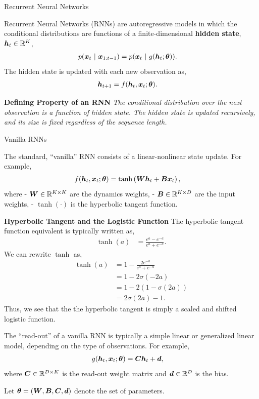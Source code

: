 \documentclass[aspectratio=169]{beamer}
\begin{document}
\begin{frame}[t,allowframebreaks]{Recurrent Neural
Networks}\label{recurrent-neural-networks-1}

Recurrent Neural Networks (RNNs) are autoregressive models in which the
conditional distributions are functions of a finite-dimensional
\textbf{hidden state}, \(\boldsymbol{h}_t \in \mathbb{R}^K\), \begin{align*}
p(\boldsymbol{x}_t ~\vert~ \boldsymbol{x}_{1:t-1}) &= p(\boldsymbol{x}_t ~\vert~ g(\boldsymbol{h}_t; \boldsymbol{\theta})).
\end{align*} The hidden state is updated with each new observation as,
\begin{align*}
\boldsymbol{h}_{t+1} &= f(\boldsymbol{h}_t, \boldsymbol{x}_t; \boldsymbol{\theta}).
\end{align*}

\textbf{Defining Property of an RNN} 
\emph{The conditional distribution over the next observation is a function of hidden state. The hidden state is updated recursively, and its size is fixed regardless of the sequence length.} 

\end{frame}

\begin{frame}[t,allowframebreaks]{Vanilla RNNs}\label{vanilla-rnns}

The standard, ``vanilla'' RNN consists of a linear-nonlinear state
update. For example, \begin{align*}
f(\boldsymbol{h}_t, \boldsymbol{x}_t; \boldsymbol{\theta})
&= \tanh \left(\boldsymbol{W} \boldsymbol{h}_t + \boldsymbol{B} \boldsymbol{x}_t \right),
\end{align*} where - \(\boldsymbol{W} \in \mathbb{R}^{K \times K}\) are the dynamics
weights, - \(\boldsymbol{B} \in \mathbb{R}^{K \times D}\) are the input weights, -
\(\tanh(\cdot)\) is the hyperbolic tangent function.

\textbf{Hyperbolic Tangent and the Logistic Function}
The hyperbolic tangent function equivalent is typically written
as, 
\begin{align*}
\tanh(a) &= \frac{e^a - e^{-a}}{e^a + e^{-a}}. 
\end{align*} 
We can rewrite $\tanh$ as, 
\begin{align*}
\tanh(a) &= 1 - \frac{2e^{-a}}{e^a + e^{-a}} \\
&= 1 - 2 \sigma(-2a) \\
&= 1 - 2 (1 - \sigma(2a)) \\
&= 2 \sigma(2a) - 1.
\end{align*} 
Thus, we see that the the hyperbolic tangent is simply a
scaled and shifted logistic function. 

The ``read-out'' of a vanilla RNN is typically a simple linear or
generalized linear model, depending on the type of observations. For
example, \begin{align*}
g(\boldsymbol{h}_t, \boldsymbol{x}_t; \boldsymbol{\theta}) &= \boldsymbol{C} \boldsymbol{h}_t + \boldsymbol{d},
\end{align*} where \(\boldsymbol{C} \in \mathbb{R}^{D \times K}\) is the read-out
weight matrix and \(\boldsymbol{d} \in \mathbb{R}^D\) is the bias.

Let \(\boldsymbol{\theta} = (\boldsymbol{W}, \boldsymbol{B}, \boldsymbol{C}, \boldsymbol{d})\) denote the set of
parameters.
\end{frame}
\end{document}
